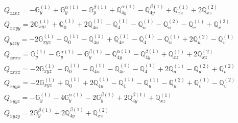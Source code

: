 \documentclass[fleqn,8pt,landscape]{jsarticle}
\begin{document}
\begin{align*}
& Q_{zzxz} = - \mathbb{G}_{y}^{(1)} + \mathbb{G}_{y}^{\alpha(1)} - \mathbb{G}_{y}^{\beta(1)} + \mathbb{Q}_{4y}^{\alpha(1)} - \mathbb{Q}_{4y}^{\beta(1)} + \mathbb{Q}_{xz}^{(1)} + 2 \mathbb{Q}_{xz}^{(2)} \\
& Q_{xxyy} = 2 \mathbb{G}_{xyz}^{(1)} + \mathbb{Q}_{0}^{(1)} + 2 \mathbb{Q}_{4u}^{(1)} - \mathbb{Q}_{4}^{(1)} - \mathbb{Q}_{u}^{(1)} - \mathbb{Q}_{u}^{(2)} - \mathbb{Q}_{v}^{(1)} + \mathbb{Q}_{v}^{(2)} \\
& Q_{yzzy} = - 2 \mathbb{G}_{xyz}^{(1)} + \mathbb{Q}_{0}^{(1)} - \mathbb{Q}_{4u}^{(1)} + \mathbb{Q}_{4v}^{(1)} - \mathbb{Q}_{4}^{(1)} - \mathbb{Q}_{u}^{(1)} + 2 \mathbb{Q}_{u}^{(2)} - \mathbb{Q}_{v}^{(1)} \\
& Q_{zxxx} = \mathbb{G}_{y}^{(1)} - \mathbb{G}_{y}^{\alpha(1)} - \mathbb{G}_{y}^{\beta(1)} - \mathbb{Q}_{4y}^{\alpha(1)} - \mathbb{Q}_{4y}^{\beta(1)} + \mathbb{Q}_{xz}^{(1)} + 2 \mathbb{Q}_{xz}^{(2)} \\
& Q_{zxxz} = - 2 \mathbb{G}_{xyz}^{(1)} + \mathbb{Q}_{0}^{(1)} - \mathbb{Q}_{4u}^{(1)} - \mathbb{Q}_{4v}^{(1)} - \mathbb{Q}_{4}^{(1)} + 2 \mathbb{Q}_{u}^{(1)} - \mathbb{Q}_{u}^{(2)} + \mathbb{Q}_{v}^{(2)} \\
& Q_{xyyx} = - 2 \mathbb{G}_{xyz}^{(1)} + \mathbb{Q}_{0}^{(1)} + 2 \mathbb{Q}_{4u}^{(1)} - \mathbb{Q}_{4}^{(1)} - \mathbb{Q}_{u}^{(1)} - \mathbb{Q}_{u}^{(2)} + \mathbb{Q}_{v}^{(1)} - \mathbb{Q}_{v}^{(2)} \\
& Q_{xyyz} = - \mathbb{G}_{y}^{(1)} - 4 \mathbb{G}_{y}^{\alpha(1)} - 2 \mathbb{G}_{y}^{\beta(1)} + 2 \mathbb{Q}_{4y}^{\beta(1)} + \mathbb{Q}_{xz}^{(1)} \\
& Q_{xyzy} = 2 \mathbb{G}_{y}^{\beta(1)} + 2 \mathbb{Q}_{4y}^{\beta(1)} + \mathbb{Q}_{xz}^{(2)}
\end{align*}
\end{document}
